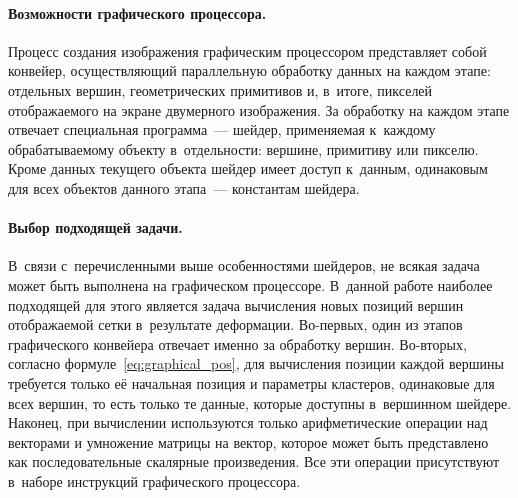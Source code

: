\documentclass[a4paper, 14pt, titlepage]{extarticle}
\begin{document}
        \paragraph{Возможности графического процессора.}
        Процесс создания изображения графическим процессором представляет собой конвейер,
        осуществляющий параллельную обработку данных на каждом этапе: отдельных вершин,
        геометрических примитивов и, в~итоге, пикселей отображаемого на экране двумерного
        изображения. За обработку на каждом этапе отвечает специальная программа~--- шейдер,
        применяемая к~каждому обрабатываемому объекту в~отдельности: вершине, примитиву или пикселю.
        Кроме данных текущего объекта шейдер имеет доступ к~данным, одинаковым для всех объектов
        данного этапа~--- константам шейдера.

        \paragraph{Выбор подходящей задачи.}
        В~связи с~перечисленными выше особенностями шейдеров, не всякая задача может быть выполнена
        на графическом процессоре. В~данной работе наиболее подходящей для этого является задача
        вычисления новых позиций вершин отображаемой сетки в~результате деформации. Во-первых, один
        из этапов графического конвейера отвечает именно за обработку вершин. Во-вторых, согласно
        формуле~\eqref{eq:graphical_pos}, для вычисления позиции каждой вершины требуется только её
        начальная позиция и параметры кластеров, одинаковые для всех вершин, то есть только те
        данные, которые доступны в~вершинном шейдере. Наконец, при вычислении используются только
        арифметические операции над векторами и умножение матрицы на вектор, которое может быть
        представлено как последовательные скалярные произведения. Все эти операции присутствуют
        в~наборе инструкций графического процессора.
\end{document}

